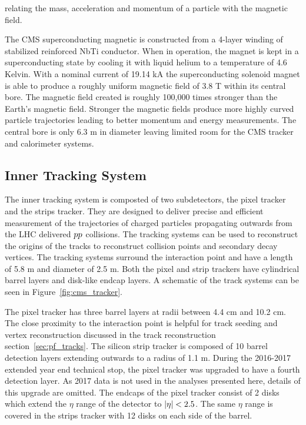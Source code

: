 relating the mass, acceleration and momentum of a particle with the magnetic field.

The CMS superconducting magnetic is constructed from a 4-layer winding of stabilized
reinforced NbTi conductor. When in operation, the magnet is kept in a superconducting state
by cooling it with liquid helium to a temperature of 4.6 Kelvin. With a nominal current
of 19.14 kA the superconducting solenoid magnet is able to produce a roughly uniform
magnetic field of 3.8 T within its central bore. The magnetic field created is roughly
100,000 times stronger than the Earth's magnetic field. Stronger the magnetic fields produce
more highly curved particle trajectories leading to better momentum and energy measurements.
The central bore is only 6.3 m in diameter
leaving limited room for the CMS tracker and calorimeter systems.



\subsection{Inner Tracking System}
The inner tracking system is composted of two subdetectors, the pixel tracker and the
strips tracker. They are designed to deliver precise and efficient measurement of
the trajectories of charged particles propagating outwards from the LHC delivered
$pp$ collisions. The tracking systems can be used to reconstruct the origins of
the tracks to reconstruct collision points and secondary decay vertices. The
tracking systems surround the interaction point and have a length of 5.8 m and 
diameter of 2.5 m. Both the pixel and strip trackers have cylindrical barrel
layers and disk-like endcap layers. A schematic of the track systems
can be seen in Figure~\ref{fig:cms_tracker}.

The pixel tracker has three barrel layers at radii between 4.4 cm and 10.2 cm. The
close proximity to the interaction point is helpful for track seeding and vertex
reconstruction discussed in the track reconstruction section~\ref{sec:pf_tracks}.
The silicon strip tracker is composed of 10 barrel detection layers extending 
outwards to a radius of 1.1 m. During the 2016-2017 extended year end technical stop,
the pixel tracker was upgraded to have a fourth detection layer. As 2017 data is not used
in the analyses presented here, details of this upgrade are omitted.
The endcaps of the pixel tracker consist of 2 disks which extend the $\eta$ 
range of the detector to $\lvert\eta\rvert < 2.5$. The same $\eta$ range is covered in the
strips tracker with 12 disks on each side of the barrel.

